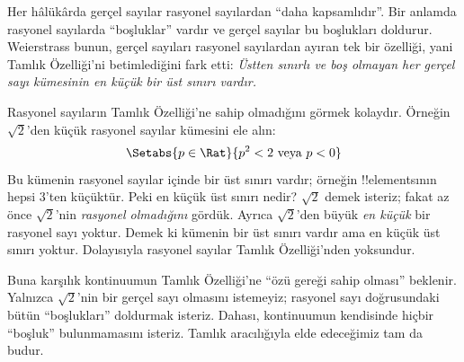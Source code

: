 Her hâlükârda gerçel sayılar rasyonel sayılardan “daha kapsamlıdır”. Bir
anlamda rasyonel sayılarda “boşluklar” vardır ve gerçel sayılar bu boşlukları
doldurur. Weierstrass bunun, gerçel sayıları rasyonel sayılardan ayıran tek bir
özelliği, yani Tamlık Özelliği'ni betimlediğini fark etti:
\emph{Üstten sınırlı ve boş olmayan her gerçel sayı kümesinin en küçük bir üst
sınırı vardır.}

Rasyonel sayıların Tamlık Özelliği'ne sahip olmadığını görmek kolaydır.
Örneğin $\sqrt{2}$'den küçük rasyonel sayılar kümesini ele alın:
\[
	\Setabs{p \in \Rat}{p^2 < 2 \text{ veya }p < 0}
\]
Bu kümenin rasyonel sayılar içinde bir üst sınırı vardır; örneğin
!!{element}s{}ının hepsi $3$'ten küçüktür. Peki en küçük üst sınırı nedir?
$\sqrt{2}$ demek isteriz; fakat az önce $\sqrt{2}$'nin \emph{rasyonel
olmadığını} gördük. Ayrıca $\sqrt{2}$'den büyük \emph{en küçük} bir rasyonel
sayı yoktur. Demek ki kümenin bir üst sınırı vardır ama en küçük üst sınırı
yoktur. Dolayısıyla rasyonel sayılar Tamlık Özelliği'nden yoksundur.

Buna karşılık kontinuumun Tamlık Özelliği'ne “özü gereği sahip olması”
beklenir. Yalnızca $\sqrt{2}$'nin bir gerçel sayı olmasını istemeyiz; rasyonel
sayı doğrusundaki bütün “boşlukları” doldurmak isteriz. Dahası, kontinuumun
kendisinde hiçbir “boşluk” bulunmamasını isteriz. Tamlık aracılığıyla elde
edeceğimiz tam da budur.

